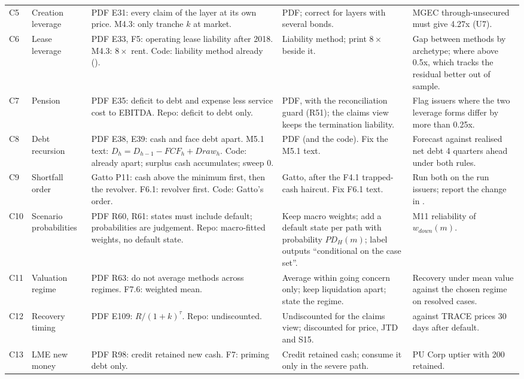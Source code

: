 \documentclass[11pt]{article}
\begin{document}
{\begin{xltabular}{\linewidth}{@{}>{\raggedright\arraybackslash}p{9mm}>{\raggedright\arraybackslash}p{24mm}>{\raggedright\arraybackslash}X>{\raggedright\arraybackslash}p{38mm}>{\raggedright\arraybackslash}p{30mm}@{}}
C5 & Creation leverage & PDF E31: every claim of the layer at its own price. M4.3: only tranche $k$ at market. & PDF; correct for layers with several bonds. & MGEC through-unsecured must give 4.27x (U7). \\
C6 & Lease leverage & PDF E33, F5: operating lease liability after 2018. M4.3: $8\times$ rent. Code: liability method already (). & Liability method; print $8\times$ beside it. & Gap between methods by archetype; where above 0.5x, which tracks the residual better out of sample. \\
C7 & Pension & PDF E35: deficit to debt and expense less service cost to EBITDA. Repo: deficit to debt only. & PDF, with the reconciliation guard (R51); the claims view keeps the termination liability. & Flag issuers where the two leverage forms differ by more than 0.25x. \\
C8 & Debt recursion & PDF E38, E39: cash and face debt apart. M5.1 text: $D_h = D_{h-1} - FCF_h + Draw_h$. Code: already apart; surplus cash accumulates; sweep 0. & PDF (and the code). Fix the M5.1 text. & Forecast against realised net debt 4 quarters ahead under both rules. \\
C9 & Shortfall order & Gatto P11: cash above the minimum first, then the revolver. F6.1: revolver first. Code: Gatto's order. & Gatto, after the F4.1 trapped-cash haircut. Fix F6.1 text. & Run both on the run issuers; report the change in . \\
C10 & Scenario probabilities & PDF R60, R61: states must include default; probabilities are judgement. Repo: macro-fitted weights, no default state. & Keep macro weights; add a default state per path with probability $PD_H(m)$; label outputs ``conditional on the case set''. & M11 reliability of $w_{down}(m)$. \\
C11 & Valuation regime & PDF R63: do not average methods across regimes. F7.6: weighted mean. & Average within going concern only; keep liquidation apart; state the regime. & Recovery under mean value against the chosen regime on resolved cases. \\
C12 & Recovery timing & PDF E109: $R/(1+k)^\tau$. Repo: undiscounted. & Undiscounted for the claims view; discounted  for price, JTD and S15. &  against TRACE prices 30 days after default. \\
C13 & LME new money & PDF R98: credit retained new cash. F7: priming debt only. & Credit retained cash; consume it only in the severe path. & PU Corp uptier with 200 retained. \\

\end{xltabular}}
\end{document}
